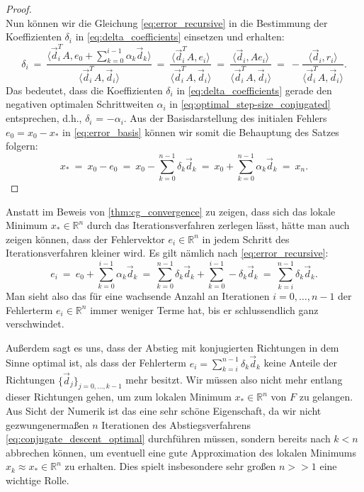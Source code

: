 \begin{proof}
\begin{equation}
\end{equation}
Nun können wir die Gleichung \eqref{eq:error_recursive} in die Bestimmung der Koeffizienten $\delta_i$ in \eqref{eq:delta_coefficients} einsetzen und erhalten:
\begin{equation*}
\delta_i \ = \ \frac{\langle \vec{d}_i^T A, e_0 +\sum_{k=0}^{i-1} \alpha_k \vec{d}_k \rangle}{\langle \vec{d}_i^T A, \vec{d}_i \rangle} \ = \ \frac{\langle \vec{d}_i^T A, e_i \rangle}{\langle \vec{d}_i^T A, \vec{d}_i \rangle} \ = \ \frac{\langle \vec{d}_i, Ae_i \rangle}{\langle \vec{d}_i^T A, \vec{d}_i \rangle} \ = \ - \frac{\langle \vec{d}_i, r_i \rangle}{\langle \vec{d}_i^T A, \vec{d}_i \rangle}.
\end{equation*}
Das bedeutet, dass die Koeffizienten $\delta_i$ in \eqref{eq:delta_coefficients} gerade den negativen optimalen Schrittweiten $\alpha_i$ in \eqref{eq:optimal_step-size_conjugated} entsprechen, d.h., $\delta_i$ = $- \alpha_i$.
Aus der Basisdarstellung des initialen Fehlers $e_0 = x_0 - x_*$ in \eqref{eq:error_basis} können wir somit die Behauptung des Satzes folgern:
\begin{equation*}
x_* \ = \ x_0 - e_0 \ = \ x_0 - \sum_{k=0}^{n-1} \delta_k \vec{d}_k \ = \ x_0 + \sum_{k=0}^{n-1} \alpha_k \vec{d}_k \ = \ x_n.
\end{equation*}
\end{proof}
\begin{remark}{}{}
\label{rem:error_cg}
Anstatt im Beweis von \cref{thm:cg_convergence} zu zeigen, dass sich das lokale Minimum $x_* \in \mathbb{R}^n$  durch das Iterationsverfahren zerlegen lässt, hätte man auch zeigen können, dass der Fehlervektor $e_i \in \mathbb{R}^n$ in jedem Schritt des Iterationsverfahren kleiner wird.
Es gilt nämlich nach \eqref{eq:error_recursive}:
\begin{equation*}
e_i \ = \ e_0 + \sum_{k=0}^{i-1} \alpha_k \vec{d}_k \ = \ \sum_{k=0}^{n-1}\delta_k \vec{d}_k + \sum_{k=0}^{i-1}-\delta_k \vec{d}_k \ = \ \sum_{k=i}^{n-1} \delta_k \vec{d}_k.
\end{equation*}
Man sieht also das für eine wachsende Anzahl an Iterationen $i=0,\ldots,n-1$ der Fehlerterm $e_i \in \mathbb{R}^n$ immer weniger Terme hat, bis er schlussendlich ganz verschwindet.

Außerdem sagt es uns, dass der Abstieg mit konjugierten Richtungen in dem Sinne optimal ist, als dass der Fehlerterm $e_i = \sum_{k=i}^{n-1} \delta_k \vec{d}_k$ keine Anteile der Richtungen $\lbrace \vec{d}_j \rbrace_{j=0,\ldots,k-1}$ mehr besitzt.
Wir müssen also nicht mehr entlang dieser Richtungen gehen, um zum lokalen Minimum $x_* \in \mathbb{R}^n$ von $F$ zu gelangen.
Aus Sicht der Numerik ist das eine sehr schöne Eigenschaft, da wir nicht gezwungenermaßen $n$ Iterationen des Abstiegsverfahrens \eqref{eq:conjugate_descent_optimal} durchführen müssen, sondern bereits nach $k < n$ abbrechen können, um eventuell eine gute Approximation des lokalen Minimums $x_k \approx x_* \in \mathbb{R}^n$ zu erhalten.
Dies spielt insbesondere sehr großen $n >> 1$ eine wichtige Rolle.
\end{remark}

